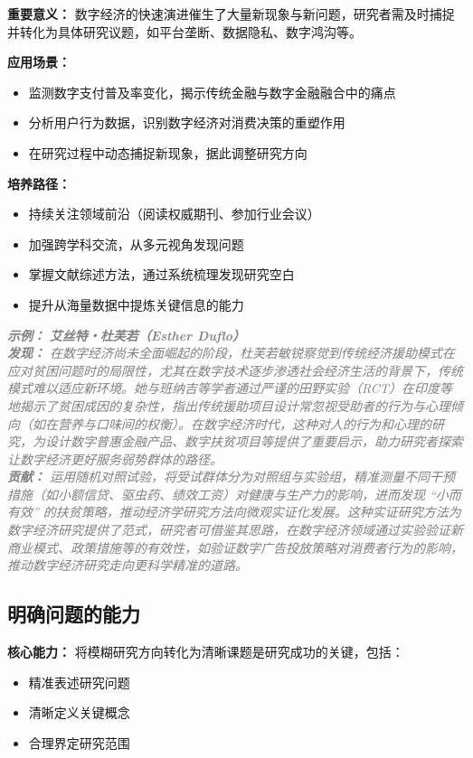 \documentclass[lang=cn,12pt,a4paper]{elegantpaper}
\newcommand{\skillexample}[1]{\smallskip\noindent\textcolor{gray}{\textit{\footnotesize\textbf{示例：}} \textit{\footnotesize #1}}}
\begin{document}
\textbf {重要意义：} 数字经济的快速演进催生了大量新现象与新问题，研究者需及时捕捉并转化为具体研究议题，如平台垄断、数据隐私、数字鸿沟等。

\textbf {应用场景：}
\begin {itemize}
\item 监测数字支付普及率变化，揭示传统金融与数字金融融合中的痛点
\item 分析用户行为数据，识别数字经济对消费决策的重塑作用
\item 在研究过程中动态捕捉新现象，据此调整研究方向
\end {itemize}

\textbf {培养路径：}
\begin {itemize}
\item 持续关注领域前沿（阅读权威期刊、参加行业会议）
\item 加强跨学科交流，从多元视角发现问题
\item 掌握文献综述方法，通过系统梳理发现研究空白
\item 提升从海量数据中提炼关键信息的能力
\end {itemize}

\skillexample {
\textbf {艾丝特・杜芙若（Esther Duflo）}\\
\textbf {发现：} 在数字经济尚未全面崛起的阶段，杜芙若敏锐察觉到传统经济援助模式在应对贫困问题时的局限性，尤其在数字技术逐步渗透社会经济生活的背景下，传统模式难以适应新环境。她与班纳吉等学者通过严谨的田野实验（RCT）在印度等地揭示了贫困成因的复杂性，指出传统援助项目设计常忽视受助者的行为与心理倾向（如在营养与口味间的权衡）。在数字经济时代，这种对人的行为和心理的研究，为设计数字普惠金融产品、数字扶贫项目等提供了重要启示，助力研究者探索让数字经济更好服务弱势群体的路径。\\
\textbf {贡献：} 运用随机对照试验，将受试群体分为对照组与实验组，精准测量不同干预措施（如小额信贷、驱虫药、绩效工资）对健康与生产力的影响，进而发现 “小而有效” 的扶贫策略，推动经济学研究方法向微观实证化发展。这种实证研究方法为数字经济研究提供了范式，研究者可借鉴其思路，在数字经济领域通过实验验证新商业模式、政策措施等的有效性，如验证数字广告投放策略对消费者行为的影响，推动数字经济研究走向更科学精准的道路。
}

\subsection {明确问题的能力}\label {sec:clarify_problem}
\textbf {核心能力：} 将模糊研究方向转化为清晰课题是研究成功的关键，包括：
\begin {itemize}
\item 精准表述研究问题
\item 清晰定义关键概念
\item 合理界定研究范围
\end {itemize}
\end{document}
